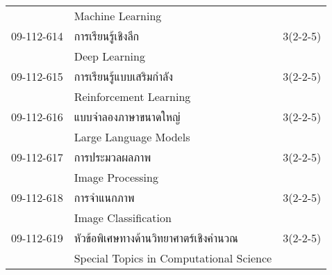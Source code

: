 \begin{longtable}{p{}p{}r{}}
 & Machine Learning & \\[3mm]
09-112-614 & การเรียนรู้เชิงลึก & 3(2-2-5)\\
 & Deep Learning & \\[3mm]
09-112-615 & การเรียนรู้แบบเสริมกำลัง & 3(2-2-5)\\
 & Reinforcement Learning & \\[3mm]
09-112-616 & แบบจำลองภาษาขนาดใหญ่ & 3(2-2-5)\\
 & Large Language Models & \\[3mm]
09-112-617 & การประมวลผลภาพ & 3(2-2-5)\\
 & Image Processing & \\[3mm]
09-112-618 & การจำแนกภาพ & 3(2-2-5)\\
 & Image Classification & \\[3mm]
09-112-619 & หัวข้อพิเศษทางด้านวิทยาศาตร์เชิงคำนวณ & 3(2-2-5)\\
 & Special Topics in Computational Science & \\[3mm]
\end{longtable}
